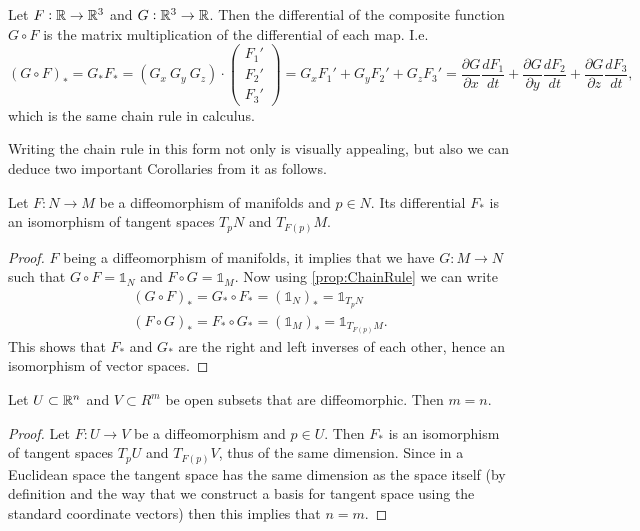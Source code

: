 \begin{example}
	Let $ F:\mathbb{R} \to \mathbb{R}^3 $ and $ G:\mathbb{R}^3 \to \mathbb{R} $. Then the differential of the composite function $ G\circ F $ is the matrix multiplication of the differential of each map. I.e.
	\[ (G \circ F)_* = G_* F_* = (G_x\ G_y\ G_z)\cdot 
	\begin{pmatrix}
		F_1' \\
		F_2' \\
		F_3'
	\end{pmatrix}
	= G_x F_1' + G_y F_2' + G_z F_3' 
	= \frac{\partial G}{\partial x} \frac{d F_1}{dt} 
	+\frac{\partial G}{\partial y} \frac{d F_2}{dt} 
	+\frac{\partial G}{\partial z} \frac{d F_3}{dt},
	 \]
	 which is the same chain rule in calculus.
\end{example}
Writing the chain rule in this form not only is visually appealing, but also we can deduce two important Corollaries from it as follows.

\begin{corollary}
	Let $ F:N\to M $ be a diffeomorphism of manifolds and $ p \in N $. Its differential $ F_* $ is an isomorphism of tangent spaces $ T_pN $ and $ T_{F(p)}M $.
\end{corollary}
\begin{proof}
	$ F $ being a diffeomorphism of manifolds, it implies that we have $ G: M \to N $ such that $ G\circ F = \mathbb{1}_N $ and $ F\circ G = \mathbb{1}_M $. Now using \autoref{prop:ChainRule} we can write
	\begin{align*}
		(G\circ F)_* = G_* \circ F_* = (\mathbb{1}_N)_* = \mathbb{1}_{T_pN}\\
		(F\circ G)_* = F_* \circ G_* = (\mathbb{1}_M)_* = \mathbb{1}_{T_{F(p)}M}.
	\end{align*}
	This shows that $ F_* $ and $ G_* $ are the right and left inverses of each other, hence an isomorphism of vector spaces.
\end{proof}
\begin{corollary}
	Let $ U \subset \mathbb{R}^n $ and $ V \subset R^m $ be open subsets that are diffeomorphic. Then $ m = n $.
\end{corollary}
\begin{proof}
	Let $ F: U \to V $ be a diffeomorphism and $ p \in U $. Then $ F_* $ is an isomorphism of tangent spaces $ T_pU $ and $ T_{F(p)}V $, thus of the same dimension. Since in a Euclidean space the tangent space has the same dimension as the space itself (by definition and the way that we construct a basis for tangent space using the standard coordinate vectors) then this implies that $ n = m $.
\end{proof}

